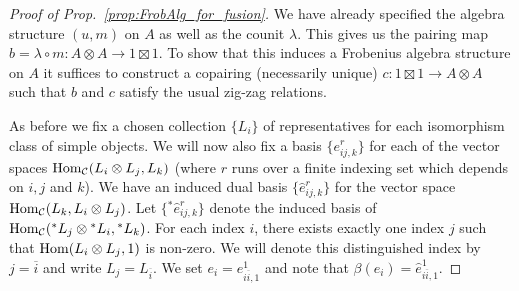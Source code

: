 \documentclass{amsart}
\begin{document}


\begin{proof}[Proof of Prop.~\ref{prop:FrobAlg_for_fusion}] 
We have already specified the algebra structure $(u,m)$ on $A$ as well as the counit $\lambda$. This gives us the pairing map $b= \lambda \circ m: A \otimes A \to 1 \boxtimes 1$. To show that this induces a Frobenius algebra structure on $A$ it suffices to construct a copairing (necessarily unique) $c: 1 \boxtimes 1 \to A \otimes A$ such that $b$ and $c$ satisfy the usual zig-zag relations. 	
	

As before we fix a chosen collection $\{L_i\}$ of representatives for each isomorphism class of simple objects. 	We will now also fix a basis $\{e_{ij, k}^r\}$ for each of the vector spaces $\operatorname{Hom}_{\mathcal C}(L_i \otimes L_j, L_k)$ (where $r$ runs over a finite indexing set which depends on $i,j$ and $k$). We have an induced dual basis $\{\hat{e}_{ij, k}^r \}$ for the vector space $\operatorname{Hom}_{\mathcal C}(L_k, L_i \otimes L_j)$. Let $\{{}^*\hat{e}_{ij, k}^r\}$ denote the induced basis of $\operatorname{Hom}_{\mathcal C}({}^*L_j \otimes {}^*L_i, {}^*L_k)$. For each index $i$, there exists exactly one index $j$ such that $\operatorname{Hom}(L_i \otimes L_j, 1)$ is non-zero. We will denote this distinguished index by $j = \overline{i}$ and write $L_j = {L}_{\overline{i}}$.  We set $e_i = e_{i \overline{i}, 1}^1$ and note that $\beta(e_i) = \hat{e}_{i \overline{i}, 1}^1$.


\end{proof}
\end{document}
